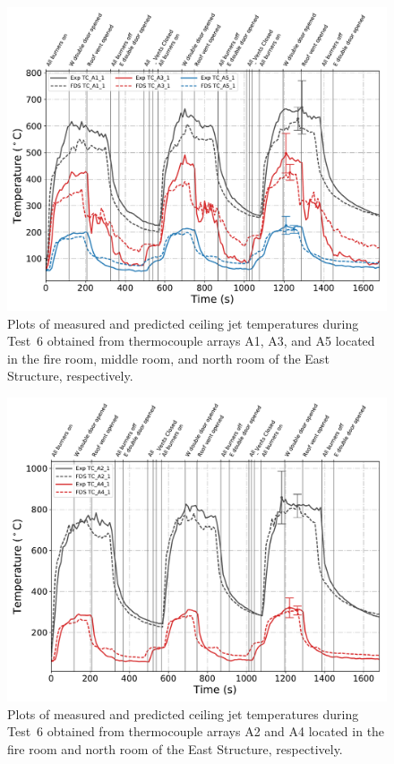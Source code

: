 \begin{figure}[!h]
	\centering
	\includegraphics[width=\columnwidth]{Figures/Plots/Validation/Temperature/Test_6_cjet_1}
	\caption[Plots of measured and predicted ceiling jet temperatures during Test~6.]{Plots of measured and predicted ceiling jet temperatures during Test~6 obtained from thermocouple arrays A1, A3, and A5 located in the fire room, middle room, and north room of the East Structure, respectively.}
	\label{fig:cjet1_data_Test6}
\end{figure}

\begin{figure}[!h]
	\centering
	\includegraphics[width=\columnwidth]{Figures/Plots/Validation/Temperature/Test_6_cjet_2}
	\caption[Plots of measured and predicted ceiling jet temperatures during Test~6.]{Plots of measured and predicted ceiling jet temperatures during Test~6 obtained from thermocouple arrays A2 and A4 located in the fire room and north room of the East Structure, respectively.}
	\label{fig:cjet2_data_Test6}
\end{figure}

